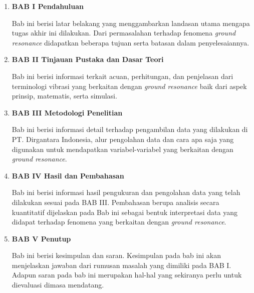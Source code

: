 \begin{enumerate}[nolistsep]

  \item \textbf{BAB I Pendahuluan}

        Bab ini berisi latar belakang yang menggambarkan landasan utama mengapa tugas akhir ini dilakukan. Dari permasalahan terhadap fenomena \textit{ground resonance} didapatkan beberapa tujuan serta batasan dalam penyelesaiannya.

        \vspace{2ex}

  \item \textbf{BAB II Tinjauan Pustaka dan Dasar Teori}

        Bab ini berisi informasi terkait acuan, perhitungan, dan penjelasan dari terminologi vibrasi yang berkaitan dengan \textit{ground resonance} baik dari aspek prinsip, matematis, serta simulasi.

        \vspace{2ex}

  \item \textbf{BAB III Metodologi Penelitian}

        Bab ini berisi informasi detail terhadap pengambilan data yang dilakukan di PT. Dirgantara Indonesia, alur pengolahan data dan cara apa saja yang digunakan untuk mendapatkan variabel-variabel yang berkaitan dengan \textit{ground resonance}.

        \vspace{2ex}

  \item \textbf{BAB IV Hasil dan Pembahasan}

        Bab ini berisi informasi hasil pengukuran dan pengolahan data yang telah dilakukan sesuai pada BAB III. Pembahasan berupa analisis secara kuantitatif dijelaskan pada Bab ini sebagai bentuk interpretasi data yang didapat terhadap fenomena yang berkaitan dengan \textit{ground resonance}.

        \vspace{2ex}

  \item \textbf{BAB V Penutup}

        Bab ini berisi kesimpulan dan saran. Kesimpulan pada bab ini akan menjelaskan jawaban dari rumusan masalah yang dimiliki pada BAB I. Adapun saran pada bab ini merupakan hal-hal yang sekiranya perlu untuk dievaluasi dimasa mendatang.

\end{enumerate}
